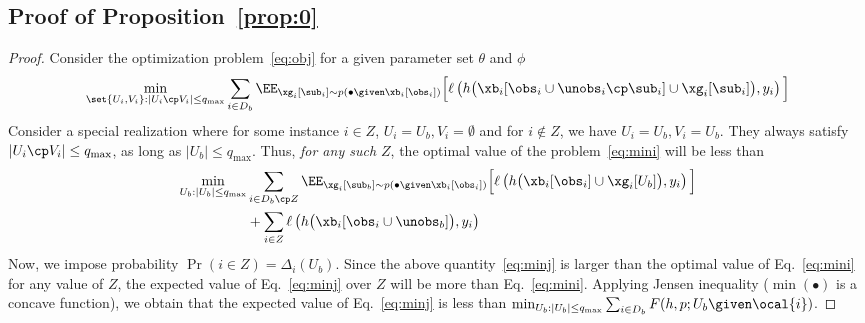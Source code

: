 \subsection{Proof of Proposition~\ref{prop:0}}
\begin{proof}
Consider the optimization problem~\eqref{eq:obj} for a given parameter set $\theta$ and $\phi$
\begin{align}
\min_{\set{U_i,V_i}: |U_i \cp V_i| \le q_{\max}}\sum_{i\in D_b}\EE_{\xg_i [\sub_i] \sim    p(\bullet \given     \xb_i[\obs_i  ])} \Big[ \ell\left(h\big(\xb_i [\obs_i \cup \unobs_i \cp\sub_i] \cup \xg_i [\sub_i]\big), y_i\right) \Big] \label{eq:mini}
\end{align}
Consider a special realization where for some instance $i \in Z$, $U_i = U_b, V_i = \emptyset$ and for $i\not\in Z$, we have $U_i=U_b, V_i = U_b$. They always satisfy $|U_i\cp V_i| \le q_{\max}$, as long as $|U_b| \le q_{\max}$. Thus, \emph{for any such $Z$}, the optimal value of the problem~\eqref{eq:mini} will be less than
\begin{align}
    \min_{U_b: |U_b| \le q_{\max}} 
  &  \sum_{i\in D_b\cp Z}\EE_{\xg_i [\sub_b] \sim    p(\bullet \given     \xb_i[\obs_i  ])} \Big[ \ell\left(h\big(\xb_i [\obs_i ] \cup \xg_i [U_b]\big), y_i\right) \Big]\nonumber\\
&  + \sum_{i\in  Z}  \ell\left(h\big(\xb_i [\obs_i \cup \unobs_b]\big), y_i\right) \label{eq:minj}
\end{align}
Now, we impose  probability $\Pr(i\in Z) = \Delta_i(U_b)$. Since the above quantity~\eqref{eq:minj} is larger than the optimal value of Eq.~\eqref{eq:mini} for any value of $Z$, the expected value of Eq.~\eqref{eq:minj} over $Z$ will be more than Eq.~\eqref{eq:mini}. Applying Jensen inequality ($\min (\bullet)$ is a concave function), we obtain that the expected value of Eq.~\eqref{eq:minj} is less than $\min_{U_b:|U_b| \le q_{\max}}\sum_{i\in D_b} F(h,p; U_b \given     \ocal{i})$.
\end{proof}


